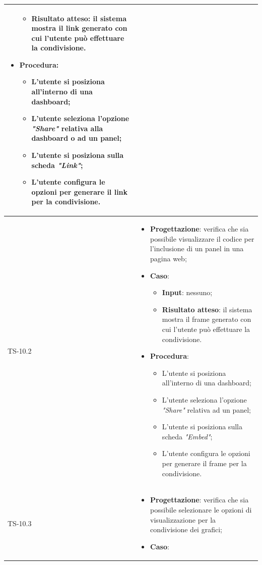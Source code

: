 \begin{longtable}{|C{2.5cm}|C{13cm}|}
\begin{itemize}
\begin{itemize}
		\item \textbf{Risultato atteso}: il sistema mostra il link generato con cui l'utente può effettuare la condivisione.
	\end{itemize}
	\item \textbf{Procedura}:
	\begin{itemize}
		\item L'utente si posiziona all'interno di una dashboard;
		\item L'utente seleziona l'opzione \emph{"Share"} relativa alla dashboard o ad un panel;
		\item L'utente si posiziona sulla scheda \emph{"Link"};
		\item L'utente configura le opzioni per generare il link per la condivisione.
	\end{itemize} 
\end{itemize}
	 \\
	\hline
	{TS-10.2} &
\begin{itemize}
	\item \textbf{Progettazione}: verifica che sia  possibile visualizzare il
	codice per l’inclusione di un panel in una pagina web;
	\item \textbf{Caso}: 
	\begin{itemize}
		\item \textbf{Input}: nessuno;
		\item \textbf{Risultato atteso}: il sistema mostra il frame generato con cui l'utente può effettuare la condivisione.
	\end{itemize}
	\item \textbf{Procedura}:
	\begin{itemize}
		\item L'utente si posiziona all'interno di una dashboard;
		\item L'utente seleziona l'opzione \emph{"Share"} relativa ad un panel;
		\item L'utente si posiziona sulla scheda \emph{"Embed"};
		\item L'utente configura le opzioni per generare il frame per la condivisione.
	\end{itemize} 
\end{itemize}
	  \\
	\hline
	{TS-10.3} &
\begin{itemize}
	\item \textbf{Progettazione}: verifica che sia possibile selezionare le
	opzioni di visualizzazione per la condivisione dei grafici;
	\item \textbf{Caso}: 

\end{itemize}
\end{longtable}
